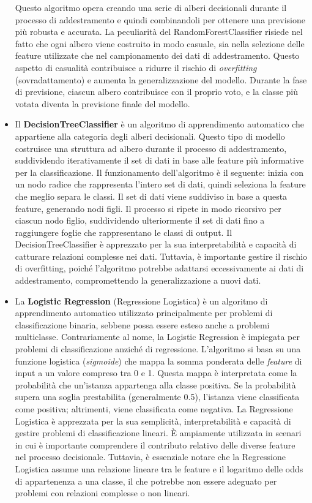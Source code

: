 \begin{itemize}
  Questo algoritmo opera creando una serie di alberi decisionali durante il processo di addestramento e quindi combinandoli per ottenere una previsione più robusta e accurata.
  La peculiarità del RandomForestClassifier risiede nel fatto che ogni albero viene costruito in modo casuale, sia nella selezione delle feature utilizzate che nel campionamento dei dati di addestramento.
  Questo aspetto di casualità contribuisce a ridurre il rischio di \textit{overfitting} (sovradattamento) e aumenta la generalizzazione del modello.
  Durante la fase di previsione, ciascun albero contribuisce con il proprio voto, e la classe più votata diventa la previsione finale del modello.
  \item Il \textbf{DecisionTreeClassifier} è un algoritmo di apprendimento automatico che appartiene alla categoria degli alberi decisionali.
  Questo tipo di modello costruisce una struttura ad albero durante il processo di addestramento, suddividendo iterativamente il set di dati in base alle feature più informative per la classificazione.
  Il funzionamento dell'algoritmo è il seguente: inizia con un nodo radice che rappresenta l'intero set di dati, quindi seleziona la feature che meglio separa le classi.
  Il set di dati viene suddiviso in base a questa feature, generando nodi figli.
  Il processo si ripete in modo ricorsivo per ciascun nodo figlio, suddividendo ulteriormente il set di dati fino a raggiungere foglie che rappresentano le classi di output.
  Il DecisionTreeClassifier è apprezzato per la sua interpretabilità e capacità di catturare relazioni complesse nei dati.
  Tuttavia, è importante gestire il rischio di overfitting, poiché l'algoritmo potrebbe adattarsi eccessivamente ai dati di addestramento, compromettendo la generalizzazione a nuovi dati.
  \item La \textbf{Logistic Regression} (Regressione Logistica) è un algoritmo di apprendimento automatico utilizzato principalmente per problemi di classificazione binaria, sebbene possa essere esteso anche a problemi multiclasse.
  Contrariamente al nome, la Logistic Regression è impiegata per problemi di classificazione anziché di regressione.
  L'algoritmo si basa su una funzione logistica (\textit{sigmoide}) che mappa la somma ponderata delle \textit{feature} di input a un valore compreso tra 0 e 1.
  Questa mappa è interpretata come la probabilità che un'istanza appartenga alla classe positiva.
  Se la probabilità supera una soglia prestabilita (generalmente 0.5), l'istanza viene classificata come positiva; altrimenti, viene classificata come negativa.
  La Regressione Logistica è apprezzata per la sua semplicità, interpretabilità e capacità di gestire problemi di classificazione lineari.
  È ampiamente utilizzata in scenari in cui è importante comprendere il contributo relativo delle diverse feature nel processo decisionale.
  Tuttavia, è essenziale notare che la Regressione Logistica assume una relazione lineare tra le feature e il logaritmo delle odds di appartenenza a una classe, il che potrebbe non essere adeguato per problemi con relazioni complesse o non lineari.
\end{itemize}

